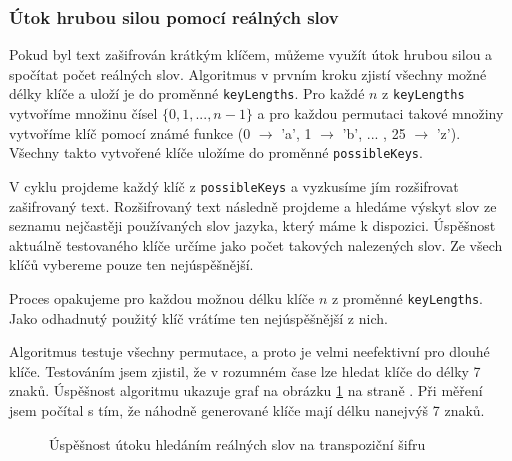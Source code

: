 \documentclass[glossaries, index]{kidiplom}
\begin{document}
\subsubsection{Útok hrubou silou pomocí reálných slov}
Pokud byl text zašifrován krátkým klíčem, můžeme využít útok hrubou silou a spočítat počet reálných slov. Algoritmus  v prvním kroku zjistí všechny možné délky klíče a uloží je do proměnné \texttt{keyLengths}. Pro každé $n$ z \texttt{keyLengths} vytvoříme množinu čísel $\{0, 1, ..., n-1\}$ a pro každou permutaci takové množiny vytvoříme klíč pomocí známé funkce (0 $\rightarrow$ 'a', 1 $\rightarrow$ 'b', ... , 25 $\rightarrow$ 'z'). Všechny takto vytvořené klíče uložíme do proměnné \texttt{possibleKeys}.

V cyklu projdeme každý klíč z \texttt{possibleKeys} a vyzkusíme jím rozšifrovat zašifrovaný text. Rozšifrovaný text následně projdeme a hledáme výskyt slov ze seznamu nejčastěji používaných slov jazyka, který máme k dispozici. Úspěšnost aktuálně testovaného klíče určíme jako počet takových nalezených slov. Ze všech klíčů vybereme pouze ten nejúspěšnější.

Proces opakujeme pro každou možnou délku klíče $n$ z proměnné \texttt{keyLengths}. Jako odhadnutý použitý klíč vrátíme ten nejúspěšnější z nich. 

Algoritmus testuje všechny permutace, a proto je velmi neefektivní pro dlouhé klíče. Testováním jsem zjistil, že v rozumném čase lze hledat klíče do délky 7 znaků. Úspěšnost algoritmu ukazuje graf na obrázku \ref{graf-transpozice-hrubousilou} na straně \pageref{graf-transpozice-hrubousilou}. Při měření jsem počítal s tím, že náhodně generované klíče mají délku nanejvýš 7 znaků. 

\begin{figure}[htbp]
\centering
{}
\caption{Úspěšnost útoku hledáním reálných slov na transpoziční šifru}
\label{graf-transpozice-hrubousilou}
\end{figure}
\end{document}
